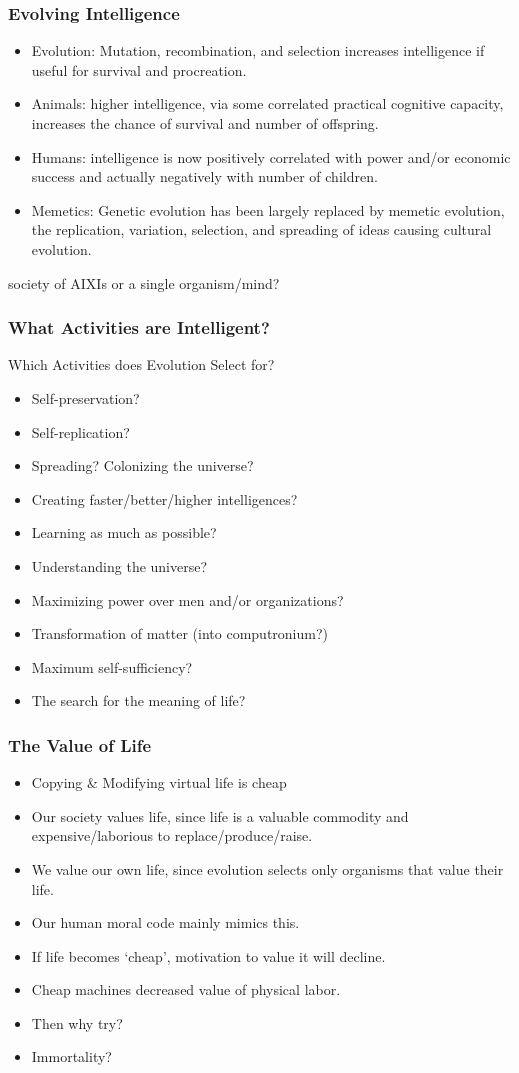 \documentclass[UTF8,11pt,colorlinks,compress,openany]{beamer}%
\begin{document}
\begin{frame}\frametitle{Evolving Intelligence}
\begin{itemize}
	\item Evolution: Mutation, recombination, and selection increases intelligence if useful for survival and procreation.
	\item Animals: higher intelligence, via some correlated practical cognitive capacity, increases the chance of survival and number of offspring.
	\item Humans: intelligence is now positively correlated with power and/or economic success and actually negatively with number of children.
	\item Memetics: Genetic evolution has been largely replaced by memetic evolution, the replication, variation, selection, and spreading of ideas causing cultural evolution.
\end{itemize}
\centerline{society of AIXIs or a single organism/mind?}
\end{frame}

\begin{frame}\frametitle{What Activities are Intelligent?}
\centerline{Which Activities does Evolution Select for?}
\begin{itemize}
	\item Self-preservation?
	\item Self-replication?
	\item Spreading? Colonizing the universe?
	\item Creating faster/better/higher intelligences?
	\item Learning as much as possible?
	\item Understanding the universe?
	\item Maximizing power over men and/or organizations?
	\item Transformation of matter (into computronium?)
	\item Maximum self-sufficiency?
	\item The search for the meaning of life?
\end{itemize}
\end{frame}

\begin{frame}\frametitle{The Value of Life}
\begin{itemize}
	\item Copying \& Modifying virtual life is cheap
	\item Our society values life, since life is a valuable commodity and expensive/laborious to replace/produce/raise.
	\item We value our own life, since evolution selects only organisms that value their life.
	\item Our human moral code mainly mimics this.
	\item If life becomes `cheap', motivation to value it will decline.
	\item Cheap machines decreased value of physical labor.
	\item Then why try?
	\item Immortality?
\end{itemize}	
\end{frame}
\end{document}
